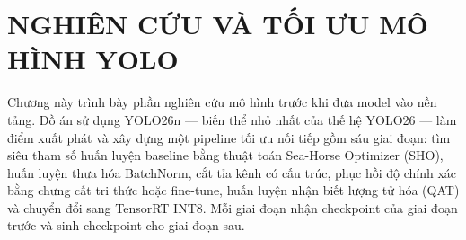 \chapter{NGHIÊN CỨU VÀ TỐI ƯU MÔ HÌNH YOLO}
\label{chap:toi-uu}

Chương này trình bày phần nghiên cứu mô hình trước khi đưa model vào nền tảng.
Đồ án sử dụng YOLO26n --- biến thể nhỏ nhất của thế hệ YOLO26 --- làm điểm xuất
phát và xây dựng một pipeline tối ưu nối tiếp gồm sáu giai đoạn: tìm siêu tham số
huấn luyện baseline bằng thuật toán Sea-Horse Optimizer (SHO), huấn luyện thưa
hóa BatchNorm, cắt tỉa kênh có cấu trúc, phục hồi độ chính xác bằng chưng cất tri
thức hoặc fine-tune, huấn luyện nhận biết lượng tử hóa (QAT) và chuyển đổi sang
TensorRT INT8. Mỗi giai đoạn nhận checkpoint của giai đoạn trước và sinh
checkpoint cho giai đoạn sau.









